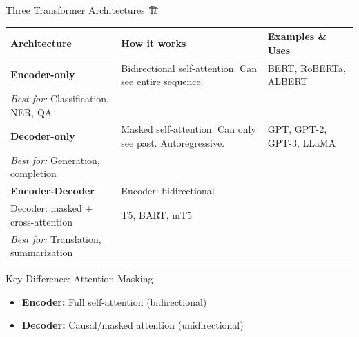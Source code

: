 \documentclass[aspectratio=169]{beamer}
\begin{document}
\begin{frame}{Three Transformer Architectures 🏗️}
\begin{center}
\begin{tabular}{p{3cm}p{4cm}p{4cm}}
\toprule
\textbf{Architecture} & \textbf{How it works} & \textbf{Examples \& Uses} \\
\midrule
\textbf{Encoder-only} &
Bidirectional self-attention. Can see entire sequence. &
BERT, RoBERTa, ALBERT\\
\textit{Best for:} Classification, NER, QA \\
\midrule
\textbf{Decoder-only} &
Masked self-attention. Can only see past. Autoregressive. &
GPT, GPT-2, GPT-3, LLaMA\\
\textit{Best for:} Generation, completion \\
\midrule
\textbf{Encoder-Decoder} &
Encoder: bidirectional\\
Decoder: masked + cross-attention &
T5, BART, mT5\\
\textit{Best for:} Translation, summarization \\
\bottomrule
\end{tabular}
\end{center}

\vspace{1em}

\begin{block}{Key Difference: Attention Masking}
\begin{itemize}\setlength{\itemsep}{0pt}
    \item \textbf{Encoder:} Full self-attention (bidirectional)
    \item \textbf{Decoder:} Causal/masked attention (unidirectional)
\end{itemize}
\end{block}
\end{frame}
\end{document}

